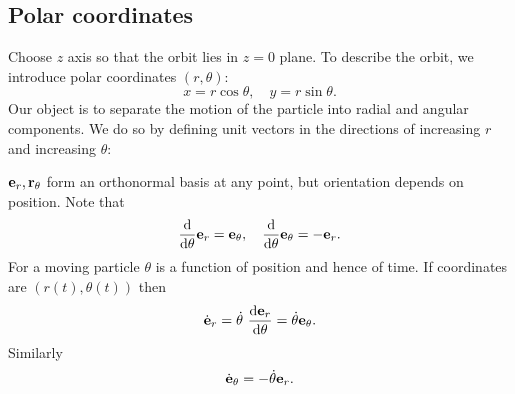 \subsection{Polar coordinates}
Choose $z$ axis so that the orbit lies in $z=0$ plane. To describe the orbit, we introduce polar coordinates $(r, \theta)$:
\[
  x = r\cos\theta, \quad y = r\sin \theta.
\]
Our object is to separate the motion of the particle into radial and angular components. We do so by defining unit vectors in the directions of increasing $r$ and increasing $\theta$:
\begin{center}
\end{center}
$ {\bf e}_r,{\bf r}_\theta $ form an orthonormal basis at any point, but orientation depends on position. Note that 
\[
    \frac{\mathrm{d}}{\mathrm{d}\theta}{\bf e}_r = {\bf e}_\theta ,\quad \frac{\mathrm{d}}{\mathrm{d}\theta}{\bf e}_\theta=-{\bf e}_r. 
\]
For a moving particle $ \theta $ is a function of position and hence of time. If coordinates are $ (r(t),\theta(t)) $ then
\[
    \dot{\bfe}_r = \dot{\theta}\ \frac{\mathrm{d}\bfe_r}{\mathrm{d}\theta} = \dot{\theta}\bfe_\theta .
\]
Similarly
\[
    \dot{{\bf e}}_\theta = - \dot{\theta}{\bf e}_r.
\]

